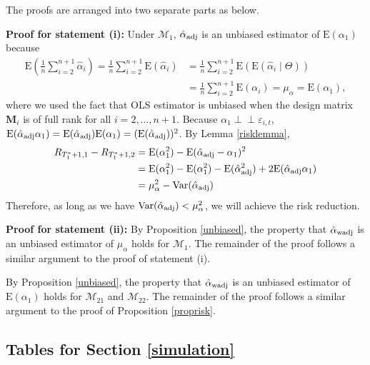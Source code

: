 \documentclass[11pt,3p,review,authoryear]{elsarticle}
\def\mbf#1{\mathbf{#1}} %
\newcommand{\indep}{\perp \!\!\! \perp } %
\def\mrm#1{\mathrm{#1}} %
\def\mc#1{\mathcal{#1}} %
\def\E#1{\mathrm{E}(#1)} %
\def\var#1{\mathrm{Var}(#1)} %
\theoremstyle{definition}
\newenvironment{proof-of-proposition}[1][{}]{\noindent{\bf
    Proof of Proposition {#1}}
  \hspace*{.5em}}{\qed\bigskip\\}
\begin{document}
\begin{proof-of-proposition}[\ref{proprisk}] The proofs are arranged into two separate parts as below.

 \textbf{Proof for statement (i):} Under $\mc{M}_1$, $\hat{\alpha}_{\rm adj}$ is an unbiased estimator of $\E{\alpha_1}$ because
  \begin{align*}
   \mrm{E}\left( \frac{1}{n}\sum_{i=2}^{n+1} \hat{\alpha}_i\right)
   = \frac{1}{n}\sum_{i=2}^{n+1}\E{\hat{\alpha}_i}
   &= \frac{1}{n}\sum_{i=2}^{n+1}\E{\E{\hat{\alpha}_i\mid \Theta}}\\
   &=  \frac{1}{n}\sum_{i=2}^{n+1}\E{\alpha_i}
   = \mu_{\alpha}=\E{\alpha_1},
  \end{align*}
  where we used the fact that OLS estimator is unbiased when the design matrix $\mbf{M}_i$ is of full rank for all $i = 2, \ldots, n+1$. Because $\alpha_1\indep \varepsilon_{i,t}$, $\E{\hat{\alpha}_{\rm adj}\alpha_1}=\E{\hat{\alpha}_{\rm adj}}\E{\alpha_1}=(\E{\hat{\alpha}_{\rm adj}})^2$. By Lemma \ref{risklemma}, 
    \begin{align*}
    R_{T_1^*+1,1}-R_{T_1^*+1,2}
    &=\E{\alpha_1^2}-\E{\hat{\alpha}_{\rm adj}-\alpha_1}^2\\
   & =\E{\alpha_1^2}-\E{\alpha_1^2}- \E{\hat{\alpha}_{\rm adj}^2}+2\E{\hat{\alpha}_{\rm adj}\alpha_1} \\
   &= \mu_{\alpha}^2 - \var{\hat{\alpha}_{\rm adj}} 
  \end{align*}
  Therefore, as long as we have $\var{\hat{\alpha}_{\rm adj}}<\mu_{\alpha}^2$, we will achieve the risk reduction. 

 \textbf{Proof for statement (ii):} By Proposition \ref{unbiased}, the property that $\hat{\alpha}_{\rm wadj}$ is an unbiased estimator of $\mu_{\alpha}$ holds for $\mc{M}_{1}$. The remainder of the proof follows a similar argument to the proof of statement (i).
\end{proof-of-proposition}



\begin{proof-of-proposition}[\ref{propriskwadj2}]
  By Proposition \ref{unbiased}, the property that $\hat{\alpha}_{\rm wadj}$ is an unbiased estimator of $\E{\alpha_1}$ holds for $\mc{M}_{21}$ and $\mc{M}_{22}$. The remainder of the proof follows a similar argument to the proof of Proposition \ref{proprisk}.
\end{proof-of-proposition}




\subsection{Tables for Section \ref{simulation}}
\label{tablesappendix}
\newpage
\end{document}
